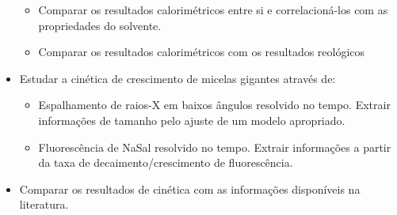 \begin{itemize}[noitemsep]
\begin{itemize}[noitemsep]
				\item Comparar os resultados calorimétricos entre si e correlacioná-los com as propriedades do solvente.
				\item Comparar os resultados calorimétricos com os resultados reológicos
			\end{itemize}
			\item Estudar a cinética de crescimento de micelas gigantes através de:
			\begin{itemize}[noitemsep]
				\item Espalhamento de raios-X em baixos ângulos resolvido no tempo. Extrair informações de tamanho pelo ajuste de um modelo apropriado.
				\item Fluorescência de NaSal resolvido no tempo. Extrair informações a partir da taxa de decaimento/crescimento de fluorescência.
			\end{itemize}
			\item Comparar os resultados de cinética com as informações disponíveis na literatura.
		\end{itemize}
		